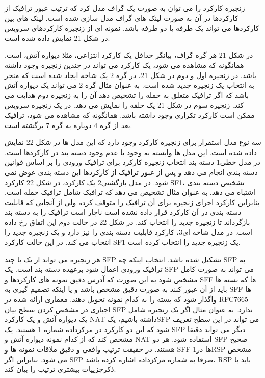 زنجیره کارکرد را می توان به صورت یک گراف مدل کرد که ترتیب عبور ترافیک از کارکردها در آن به صورت لینک های گراف مدل سازی شده است. لینک های بین کارکردها می تواند یک طرفه یا دو طرفه باشد. نمونه ای از زنجیره کارکردهای سرویس در شکل 21 نمایش داده شده است.

در شکل 21 هر گره گراف، بیانگر حداقل یک کارکرد انتزاعی، مثلا دیواره آتش، است. همانگونه که مشاهده می شود، یک کارکرد می تواند در چندین زنجیره وجود داشته باشد. در زنجیره اول و دوم در شکل 21، در گره 2  یک شاخه ایجاد شده است که منجر به انتخاب یک زنجیره جدید شده است. به عنوان مثال گره 2 می تواند یک دیواره آتش باشد که اگر ترافیک متعلق به حمله را تشخیص دهد آن را به زنجیره دوم هدایت می کند. زنجیره سوم در شکل 21 یک حلقه را نمایش می دهد. در یک زنجیره سرویس ممکن است کارکرد تکراری وجود داشته باشد. همانگونه که مشاهده می شود، ترافیک بعد از گره 4 دوباره به گره 7 برگشته است.

سه نوع مدل استقرار برای زنجیره کارکرد وجود دارد که این مدل ها در شکل 22 نمایش داده شده است. این مدل ها وابسته به وجود یا عدم وجود دسته بند در کارکردها است. در مدل خطی1 دسته بند انتخاب زنجیره کارکرد برای ترافیک ورودی را بر اساس قوانین دسته بندی انجام می دهد و پس از عبور ترافیک از کارکردها این دسته بندی عوض نمی شود. در مدل بازگشتی2 یک کارکرد، در شکل 22 کارکرد SF1، تشخیص دسته بندی اشتباه می دهد. به عنوان مثال تشخیص می دهد که ترافیک شامل ترافیک حمله است. بنابراین کارکرد اجرای زنجیره برای آن ترافیک را متوقف کرده ولی از آنجایی که قابلیت دسته بندی در آن کارکرد قرار داده نشده است ناچار است ترافیک را به دسته بند بازگرداند تا زنجیره جدید را انتخاب کند. در شکل 22 در حالت دوم این اتفاق رخ داده است. در مدل شاخه ای3، کارکرد قابلیت دسته بندی را نیز دارد و یک زنجیره جدید را انتخاب می کند. در این حالت کارکرد SF1 یک زنجیره جدید را انتخاب کرده است.

هر زنجیره می تواند از یک یا چند SFP تشکیل شده باشد. انتخاب اینکه چه SFP به ترافیک ورودی اعمال شود برعهده دسته بند است. یک SFP می تواند به صورت کامل مشخص شود به این صورت که آدرس دقیق نمونه های کارکردها و SFF ها که بسته ها باید از آن عبور کنند به صورت دقیق مشخص باشد و یا اینکه تصمیم گیری به SFF ها واگذار شود که بسته را به کدام نمونه تحویل دهند. معماری ارائه شده در RFC7665 اجباری در مشخص کردن سطح بیان SFP ندارد. به عنوان مثال اگر یک زنجیره شامل یک دیواره آتش و یک کارکرد NAT داشته باشیم، یکSFP  می تواند در این سطح تعریف شود که این دو کارکرد در مرکزداده شماره 1 هستند. یک SFP دیگر می تواند دقیقا مشخص کند که از کدام نمونه دیواره آتش و NAT استفاده شود. هر دو SFP صحیح هستند. در حقیقت ترتیب واقعی و دقیق ملاقات نمونه ها و SFF ها در1RSP مشخص می شود. بنابراین اگر SFP صرفا به شماره مرکزداده اشاره کرده باشد، RSP باید با ذکرجزییات بیشتری ترتیب را بیان کند.

